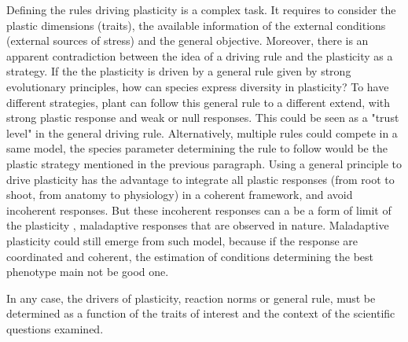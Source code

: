 Defining the rules driving plasticity is a complex task. It requires to consider the plastic dimensions (traits), the available information of the external conditions (external sources of stress) and the general objective. Moreover, there is an apparent contradiction between the idea of a driving rule and the plasticity as a strategy. If the the plasticity is driven by a general rule given by strong evolutionary principles, how can species express diversity in plasticity? To have different strategies, plant can follow this general rule to a different extend, with strong plastic response and weak or null responses. This could be seen as a "trust level" in the general driving rule. Alternatively, multiple rules could compete in a same model, the species parameter determining the rule to follow would be the plastic strategy mentioned in the previous paragraph. Using a general principle to drive plasticity has the advantage to integrate all plastic responses (from root to shoot, from anatomy to physiology) in a coherent framework, and avoid incoherent responses. But these incoherent responses can a be a form of limit of the plasticity \parencite{dewitt_costs_1998, van_kleunen_constraints_2005}, maladaptive responses that are observed in nature. Maladaptive plasticity could still emerge from such model, because if the response are coordinated and coherent, the estimation of conditions determining the best phenotype main not be good one.

In any case, the drivers of plasticity, reaction norms or general rule, must be determined as a function of the traits of interest and the context of the scientific questions examined.


%
%
%
%

%





